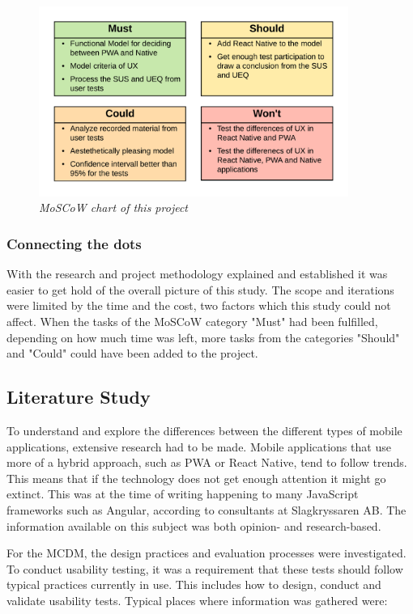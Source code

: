 \begin{figure}[ht]
    \centering 
    \includegraphics[width=0.9\textwidth]{img/moscow.png}
    \hfill
    \caption{\textit{MoSCoW chart of this project}}
    \label{fig:MoSCoW}
\end{figure}

\subsubsection{Connecting the dots}

With the research and project methodology explained and established it was easier to get hold of the overall picture of this study. The scope and iterations were limited by the time and the cost, two factors which this study could not affect. When the tasks of the MoSCoW category "Must" had been fulfilled, depending on how much time was left, more tasks from the categories "Should" and "Could" could have been added to the project.

\subsection{Literature Study}

To understand and explore the differences between the different types of mobile applications, extensive research had to be made. Mobile applications that use more of a hybrid approach, such as PWA or React Native, tend to follow trends. This means that if the technology does not get enough attention it might go extinct. This was at the time of writing happening to many JavaScript frameworks such as Angular, according to consultants at Slagkryssaren AB. The information available on this subject was both opinion- and research-based.

For the MCDM, the design practices and evaluation processes were investigated. 
To conduct usability testing, it was a requirement that these tests should follow typical practices currently in use. This includes how to design, conduct and validate usability tests.
Typical places where information was gathered were:

